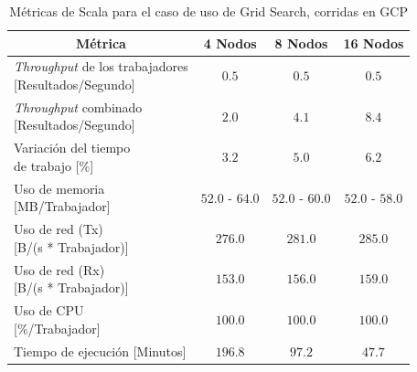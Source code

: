 \documentclass[11pt]{article}
\providecommand{\row}[1]{\parbox{150pt}{\setlength{\baselineskip}{0.2\baselineskip}\strut#1\strut}}
\newcommand{\gscap}[2]{\caption{Métricas de #1 para el caso de uso de Grid Search, corridas en #2}}
\newcommand{\english}[1]{\textit{#1}}
\begin{document}
\begin{table}[H]
\centering
\begin{tabular}{|l|c|c|c|}
\hline
\multicolumn{1}{|c|}{Métrica} & 4 Nodos & 8 Nodos & 16 Nodos \\ \hline
\row{\english{Throughput} de los trabajadores\\{[Resultados/Segundo]}} & $0.5$ & $0.5$ & $0.5$ \\ \hline
\row{\english{Throughput} combinado\\{[Resultados/Segundo]}} & $2.0$ & $4.1$ & $8.4$ \\ \hline
\row{Variación del tiempo\\de trabajo {[\%]}} & $3.2$ & $5.0$ & $6.2$ \\ \hline
\row{Uso de memoria\\{[MB/Trabajador]}} & $52.0$ - $64.0$ & $52.0$ - $60.0$ & $52.0$ - $58.0$ \\ \hline
\row{Uso de red (Tx)\\{[B/(s * Trabajador)]}} & $276.0$ & $281.0$ & $285.0$ \\ \hline
\row{Uso de red (Rx)\\{[B/(s * Trabajador)]}} & $153.0$ & $156.0$ & $159.0$ \\ \hline
\row{Uso de CPU\\{[\%/Trabajador]}} & $100.0$ & $100.0$ & $100.0$ \\ \hline
Tiempo de ejecución [Minutos] & $196.8$ & $97.2$ & $47.7$ \\ \hline
\end{tabular}
\gscap{Scala}{GCP}
\end{table}
\end{document}
